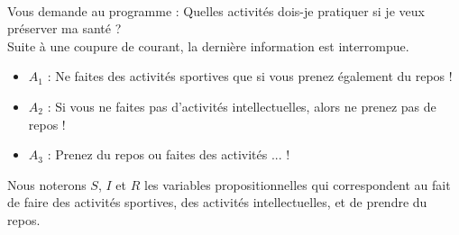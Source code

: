 \documentclass[11pt,a4paper]{article}
\begin{document}
\begin{Exercise}[title = {Logique et calcul des propositions}, origin = {\bac \; {\sc ccp 2015}}]
\ExePart[name = Deuxième cas]\\
Vous demande au programme : \og{} Quelles activités dois-je pratiquer si je veux préserver ma santé ?\fg{}\\
Suite à une coupure de courant, la dernière information est interrompue. 
\begin{itemize}
	\item[] $A_1$ : Ne faites des activités sportives que si vous prenez également du repos !
	\item[] $A_2$ : Si vous ne faites pas d'activités intellectuelles, alors ne prenez pas de repos !
	\item[] $A_3$ : Prenez du repos ou faites des activités ... !
\end{itemize}
Nous noterons $S$,  $I$ et $R$ les variables propositionnelles qui correspondent au fait de faire des activités sportives, des activités intellectuelles, et de prendre du repos.
\end{Exercise}
\end{document}

